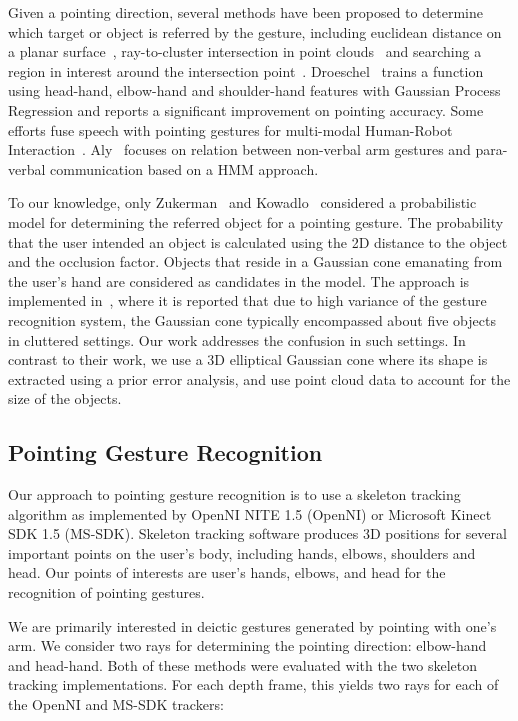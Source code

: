 Given a pointing direction, several methods have been proposed to determine which target or object is referred by the gesture, including euclidean distance on a planar surface~\cite{cheng2009hand}, ray-to-cluster intersection in point clouds~\cite{blodow2011inferring, quintero2013sepo} and searching a region in interest around the intersection point~\cite{schmidt2008interacting}. Droeschel~\cite{droeschel2011learning} trains a function using head-hand, elbow-hand and shoulder-hand features with Gaussian Process Regression and reports a significant improvement on pointing accuracy. Some efforts fuse speech with pointing gestures for multi-modal Human-Robot Interaction~\cite{aly2012integrated,kowadlo2010influence}. Aly~\cite{aly2012integrated} focuses on relation between non-verbal arm gestures and para-verbal communication based on a HMM approach.

To our knowledge, only Zukerman~\cite{zukerman2011speaking} and Kowadlo~\cite{kowadlo2010influence} considered a probabilistic model for determining the referred object for a pointing gesture. The probability that the user intended an object is calculated using the 2D distance to the object and the occlusion factor. Objects that reside in a Gaussian cone emanating from the user's hand are considered as candidates in the model. The approach is implemented in~\cite{zukerman2011speaking}, where it is reported that due to high variance of the gesture recognition system, the Gaussian cone typically encompassed about five objects in cluttered settings. Our work addresses the confusion in such settings. In contrast to their work, we use a 3D elliptical Gaussian cone where its shape is extracted using a prior error analysis, and use point cloud data to account for the size of the objects.

\subsection{Pointing Gesture Recognition}
\label{sec:pointing_pointing_gesture_recognition}

Our approach to pointing gesture recognition is to use a skeleton tracking algorithm as implemented by OpenNI NITE 1.5 (OpenNI) or Microsoft Kinect SDK 1.5 (MS-SDK). Skeleton tracking software produces 3D positions for several important points on the user's body, including hands, elbows, shoulders and head. Our points of interests are user's hands, elbows, and head for the recognition of pointing gestures.


We are primarily interested in deictic gestures generated by pointing with one's arm. We consider two rays for determining the pointing direction: elbow-hand and head-hand. Both of these methods were evaluated with the two skeleton tracking implementations. For each depth frame, this yields two rays for each of the OpenNI and MS-SDK trackers:

